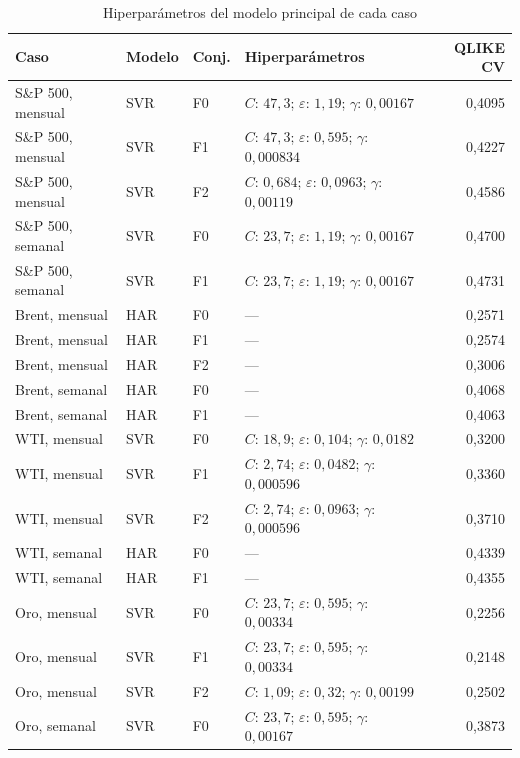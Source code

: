 \begin{longtable}{@{}lllp{}r@{}}
\caption{Hiperparámetros del modelo principal de cada caso}\label{tab:anexo_hiperparametros}\\
\toprule
Caso & Modelo & Conj. & Hiperparámetros & QLIKE CV \\
\midrule
\endhead
S\&P 500, mensual & SVR & F0 & $C$: $47{,}3$; $\varepsilon$: $1{,}19$; $\gamma$: $0{,}00167$ & 0,4095 \\
S\&P 500, mensual & SVR & F1 & $C$: $47{,}3$; $\varepsilon$: $0{,}595$; $\gamma$: $0{,}000834$ & 0,4227 \\
S\&P 500, mensual & SVR & F2 & $C$: $0{,}684$; $\varepsilon$: $0{,}0963$; $\gamma$: $0{,}00119$ & 0,4586 \\
S\&P 500, semanal & SVR & F0 & $C$: $23{,}7$; $\varepsilon$: $1{,}19$; $\gamma$: $0{,}00167$ & 0,4700 \\
S\&P 500, semanal & SVR & F1 & $C$: $23{,}7$; $\varepsilon$: $1{,}19$; $\gamma$: $0{,}00167$ & 0,4731 \\
Brent, mensual & HAR & F0 & --- & 0,2571 \\
Brent, mensual & HAR & F1 & --- & 0,2574 \\
Brent, mensual & HAR & F2 & --- & 0,3006 \\
Brent, semanal & HAR & F0 & --- & 0,4068 \\
Brent, semanal & HAR & F1 & --- & 0,4063 \\
WTI, mensual & SVR & F0 & $C$: $18{,}9$; $\varepsilon$: $0{,}104$; $\gamma$: $0{,}0182$ & 0,3200 \\
WTI, mensual & SVR & F1 & $C$: $2{,}74$; $\varepsilon$: $0{,}0482$; $\gamma$: $0{,}000596$ & 0,3360 \\
WTI, mensual & SVR & F2 & $C$: $2{,}74$; $\varepsilon$: $0{,}0963$; $\gamma$: $0{,}000596$ & 0,3710 \\
WTI, semanal & HAR & F0 & --- & 0,4339 \\
WTI, semanal & HAR & F1 & --- & 0,4355 \\
Oro, mensual & SVR & F0 & $C$: $23{,}7$; $\varepsilon$: $0{,}595$; $\gamma$: $0{,}00334$ & 0,2256 \\
Oro, mensual & SVR & F1 & $C$: $23{,}7$; $\varepsilon$: $0{,}595$; $\gamma$: $0{,}00334$ & 0,2148 \\
Oro, mensual & SVR & F2 & $C$: $1{,}09$; $\varepsilon$: $0{,}32$; $\gamma$: $0{,}00199$ & 0,2502 \\
Oro, semanal & SVR & F0 & $C$: $23{,}7$; $\varepsilon$: $0{,}595$; $\gamma$: $0{,}00167$ & 0,3873 \\

\end{longtable}
